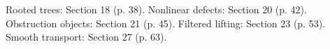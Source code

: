 {\small Rooted trees: Section 18 (p. 38). Nonlinear defects: Section 20 (p. 42). Obstruction objects: Section 21 (p. 45). Filtered lifting: Section 23 (p. 53). Smooth transport: Section 27 (p. 63).\par}
